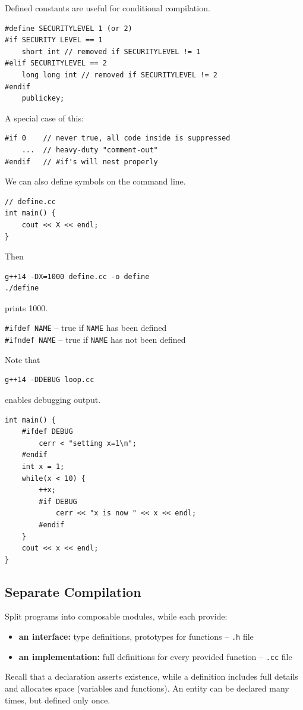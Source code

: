 \documentclass[11pt]{article}
\theoremstyle{definition}
\begin{document}
Defined constants are useful for conditional compilation.
\begin{lstlisting}
#define SECURITYLEVEL 1 (or 2)
#if SECURITY LEVEL == 1
    short int // removed if SECURITYLEVEL != 1
#elif SECURITYLEVEL == 2
    long long int // removed if SECURITYLEVEL != 2
#endif
    publickey;
\end{lstlisting}
A special case of this:
\begin{lstlisting}
#if 0    // never true, all code inside is suppressed
    ...  // heavy-duty "comment-out"
#endif   // #if's will nest properly
\end{lstlisting}
We can also define symbols on the command line.
\begin{lstlisting}
// define.cc
int main() {
    cout << X << endl;
}
\end{lstlisting}
Then
\begin{verbatim}
g++14 -DX=1000 define.cc -o define
./define
\end{verbatim}
prints 1000.

{\tt \#ifdef NAME} -- true if {\tt NAME} has been defined \\
{\tt \#ifndef NAME} -- true if {\tt NAME} has not been defined

Note that
\begin{verbatim}
g++14 -DDEBUG loop.cc
\end{verbatim}
enables debugging output.
\begin{lstlisting}
int main() {
    #ifdef DEBUG
        cerr < "setting x=1\n";
    #endif
    int x = 1;
    while(x < 10) {
        ++x;
        #if DEBUG
            cerr << "x is now " << x << endl;
        #endif
    }
    cout << x << endl;
}
\end{lstlisting}

\subsection{Separate Compilation}
Split programs into composable modules, while each provide: \vspace{-0.25cm}
\begin{itemize}
\item {\bf an interface:} type definitions, prototypes for functions -- {\tt .h} file 
\item {\bf an implementation:} full definitions for every provided function -- {\tt .cc} file 
\end{itemize}
\vspace{-0.25cm}
Recall that a declaration asserts existence, while a definition includes full details and allocates space (variables and functions). An entity can be declared many times, but defined only once. 
\end{document}

